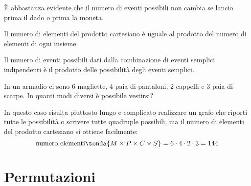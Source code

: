 \begin{newoss}{}{}
È abbastanza evidente che il numero di eventi possibili non cambia se lancio 
prima il dado o prima la moneta.
\end{newoss}

Il numero di elementi del prodotto cartesiano è uguale al prodotto del 
numero di elementi di ogni insieme.

\begin{newdef}{}{}
Il numero di eventi possibili dati dalla combinazione di eventi semplici 
indipendenti è il prodotto delle possibilità degli eventi semplici.
\end{newdef}

\begin{esempio}
In un armadio ci sono 6 magliette, 4 paia di pantaloni, 2 cappelli e 3 paia 
di scarpe. 
In quanti modi diversi è possibile vestirsi?

In questo caso risulta piuttosto lungo e complicato realizzare un grafo che 
riporti tutte le possibilità o scrivere tutte quadruple possibili, ma il 
numero di elementi del prodotto cartesiano si ottiene facilmente:
\[\text{numero elementi}\tonda{M \times P \times C \times S} = 
  6 \cdot 4 \cdot 2 \cdot 3 = 144\]
\end{esempio}

\section{Permutazioni}
\label{sec:calc_combinatorio_permutazioni}

